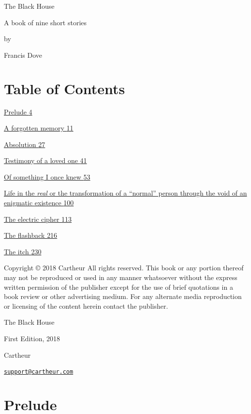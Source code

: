 The Black House

A book of nine short stories

by

Francis Dove

\section{Table of Contents}\label{table-of-contents}

\hyperref[prelude]{Prelude \hyperref[prelude]{4}}

\hyperref[a-forgotten-memory]{A forgotten memory
\hyperref[a-forgotten-memory]{11}}

\hyperref[absolution]{Absolution \hyperref[absolution]{27}}

\hyperref[testimony-of-a-loved-one]{Testimony of a loved one
\hyperref[testimony-of-a-loved-one]{41}}

\hyperref[of-something-i-once-knew]{Of something I once knew
\hyperref[of-something-i-once-knew]{53}}

\hyperref[life-in-the-real-or-the-transformation-of-a-normal-person-through-the-void-of-an-enigmatic-existence]{Life
in the \emph{real} or the transformation of a ``normal'' person through
the void of an enigmatic existence
\hyperref[life-in-the-real-or-the-transformation-of-a-normal-person-through-the-void-of-an-enigmatic-existence]{100}}

\hyperref[the-electric-cipher]{The electric cipher
\hyperref[the-electric-cipher]{113}}

\hyperref[the-flashback]{The flashback \hyperref[the-flashback]{216}}

\hyperref[the-itch]{The itch \hyperref[the-itch]{230}}

Copyright © 2018 Cartheur All rights reserved. This book or any portion
thereof may not be reproduced or used in any manner whatsoever without
the express written permission of the publisher except for the use of
brief quotations in a book review or other advertising medium. For any
alternate media reproduction or licensing of the content herein contact
the publisher.

The Black House

First Edition, 2018

Cartheur

\href{mailto:support@cartheur.com}{\nolinkurl{support@cartheur.com}}

\section{Prelude}\label{prelude}

